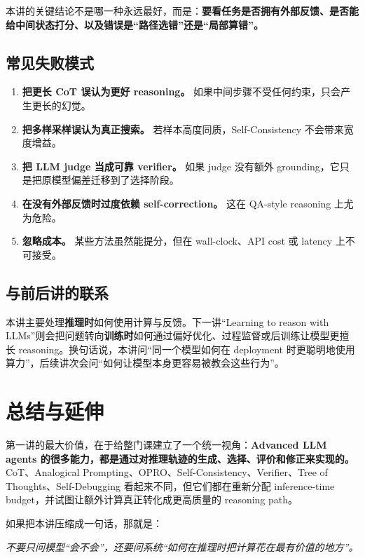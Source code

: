 本讲的关键结论不是哪一种永远最好，而是：\textbf{要看任务是否拥有外部反馈、是否能给中间状态打分、以及错误是“路径选错”还是“局部算错”。}

\subsection{常见失败模式}

\begin{enumerate}
\item \textbf{把更长 CoT 误认为更好 reasoning。} 如果中间步骤不受任何约束，只会产生更长的幻觉。
\item \textbf{把多样采样误认为真正搜索。} 若样本高度同质，Self-Consistency 不会带来宽度增益。
\item \textbf{把 LLM judge 当成可靠 verifier。} 如果 judge 没有额外 grounding，它只是把原模型偏差迁移到了选择阶段。
\item \textbf{在没有外部反馈时过度依赖 self-correction。} 这在 QA-style reasoning 上尤为危险。
\item \textbf{忽略成本。} 某些方法虽然能提分，但在 wall-clock、API cost 或 latency 上不可接受。
\end{enumerate}

\subsection{与前后讲的联系}

本讲主要处理\textbf{推理时}如何使用计算与反馈。下一讲“Learning to reason with LLMs”则会把问题转向\textbf{训练时}如何通过偏好优化、过程监督或后训练让模型更擅长 reasoning。换句话说，本讲问“同一个模型如何在 deployment 时更聪明地使用算力”，后续讲次会问“如何让模型本身更容易被教会这些行为”。

\section{总结与延伸}

第一讲的最大价值，在于给整门课建立了一个统一视角：\textbf{Advanced LLM agents 的很多能力，都是通过对推理轨迹的生成、选择、评价和修正来实现的。} CoT、Analogical Prompting、OPRO、Self-Consistency、Verifier、Tree of Thoughts、Self-Debugging 看起来不同，但它们都在重新分配 inference-time budget，并试图让额外计算真正转化成更高质量的 reasoning path。

如果把本讲压缩成一句话，那就是：

\begin{center}
\emph{不要只问模型“会不会”，还要问系统“如何在推理时把计算花在最有价值的地方”。}
\end{center}

